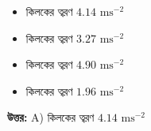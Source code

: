 \documentclass[12pt, a4paper]{article}
\begin{document}
\vspace{1em}

\begin{itemize}[label={}, leftmargin=1cm, itemsep=0.5em]
\item[\textbf{A)}] কিলকের ত্বরণ $4.14\text{ ms}^{-2}$
\item[\textbf{B)}] কিলকের ত্বরণ $3.27\text{ ms}^{-2}$
\item[\textbf{C)}] কিলকের ত্বরণ $4.90\text{ ms}^{-2}$
\item[\textbf{D)}] কিলকের ত্বরণ $1.96\text{ ms}^{-2}$
\end{itemize}

\vspace{0.5em}
\begin{tcolorbox}[answerbox]
\textbf{\color{success} উত্তর:} A) কিলকের ত্বরণ $4.14\text{ ms}^{-2}$
\end{tcolorbox}
\vspace{1em}
\end{document}
